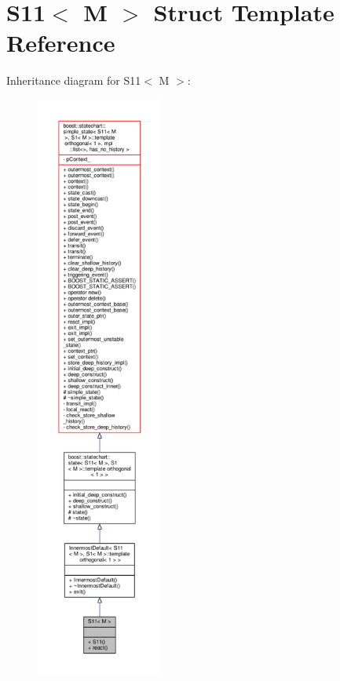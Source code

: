\hypertarget{struct_s11}{}\section{S11$<$ M $>$ Struct Template Reference}
\label{struct_s11}


Inheritance diagram for S11$<$ M $>$\+:
\nopagebreak
\begin{figure}[H]
\begin{center}
\leavevmode
\includegraphics[height=550pt]{struct_s11__inherit__graph}
\end{center}
\end{figure}


